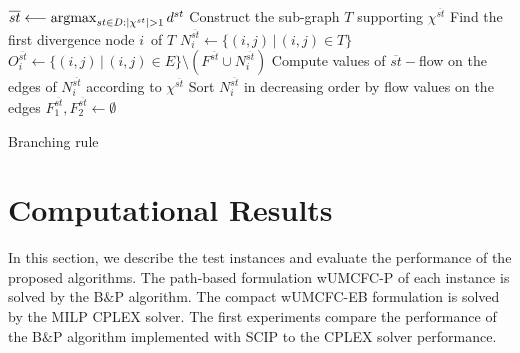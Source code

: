 \begin{algorithm}[H]
          \SetAlgoVlined       \DontPrintSemicolon      {}   %
          \(\overline{st}\longleftarrow \operatorname{argmax}_{st \in D: |\chi^{st}| > 1} d^{st}\)\;
         Construct the sub-graph \(T\) supporting \(\chi^{\overline{st}}\)\;
          Find the first divergence node \(i\)\ of \(T\)\;
          \(N_i^{\overline{st}}\longleftarrow \{(i,j)\,|\,(i,j) \in T\}\) \;
          \(O_i^{\overline{st}}\longleftarrow  \{(i,j) \,|\, (i,j) \in E\} \setminus (F^{\overline{st}} \cup N_i^{\overline{st}})\) \;
          Compute values of  \(\overline{st}-\)flow  on the edges of \(N_i^{\overline{st}}\) according to  \(\chi^{\overline{st}}\)\;
          Sort \(N_i^{\overline{st}}\) in decreasing order by flow values on the edges\;
          \(F^{\overline{st}}_1, F^{\overline{st}}_2 \longleftarrow \emptyset \)\;
          \;
          \caption{Branching rule \label{branch}}
\end{algorithm}

\section{Computational Results}\label{NumResults}
\label{sec5}

In this section, we describe the test instances and evaluate the performance of the proposed algorithms.
The path-based formulation wUMCFC-P of each instance is solved by the B\(\&\)P algorithm.
The compact wUMCFC-EB formulation is solved by the MILP CPLEX solver.
The first experiments compare the performance of the B\(\&\)P algorithm implemented with SCIP to the CPLEX solver performance.

